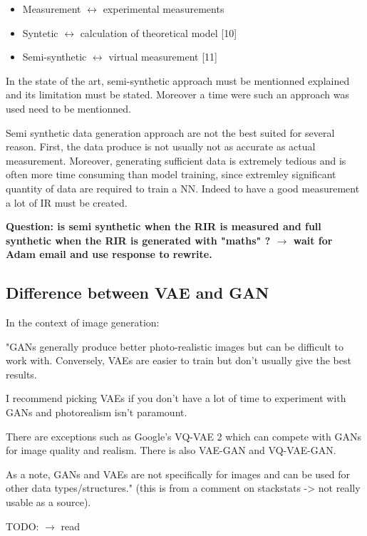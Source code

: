 \documentclass{article}
\begin{document}
\begin{itemize}
    \item Measurement $\leftrightarrow$ experimental measurements
    \item Syntetic $\leftrightarrow$ calculation of theoretical model [10]
    \item Semi-synthetic $\leftrightarrow$ virtual measurement [11]
\end{itemize}

In the state of the art, semi-synthetic approach must be mentionned explained and its limitation must be stated. Moreover a time were such an approach was used need to be mentionned.

Semi synthetic data generation approach are not the best suited for several reason. First, the data produce is not usually not as accurate as actual measurement. Moreover, generating sufficient data is extremely tedious and is often more time consuming than model training, since extremley significant quantity of data are required to train a NN. Indeed to have a good measurement a lot of IR must be created.

\textbf{Question: is semi synthetic when the RIR is measured and full synthetic when the RIR is generated with "maths" ? $\rightarrow$ wait for Adam email and use response to rewrite.}




\subsection{Difference between VAE and GAN}

In the context of image generation:

"GANs generally produce better photo-realistic images but can be difficult to work with. Conversely, VAEs are easier to train but don’t usually give the best results.

I recommend picking VAEs if you don’t have a lot of time to experiment with GANs and photorealism isn’t paramount.

There are exceptions such as Google’s VQ-VAE 2 which can compete with GANs for image quality and realism. There is also VAE-GAN and VQ-VAE-GAN.

As a note, GANs and VAEs are not specifically for images and can be used for other data types/structures." (this is from a comment on stackstats -> not really usable as a source).

TODO: $\rightarrow$ read \cite{10.1007/978-3-030-38961-1_8}
\end{document}

